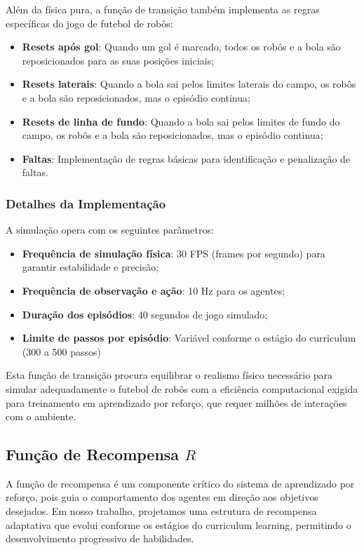 Além da física pura, a função de transição também implementa as regras específicas do jogo de futebol de robôs:

\begin{itemize}
    \item \textbf{Resets após gol}: Quando um gol é marcado, todos os robôs e a bola são reposicionados para as suas posições iniciais;
    \item \textbf{Resets laterais}: Quando a bola sai pelos limites laterais do campo, os robôs e a bola são reposicionados, mas o episódio continua;
    \item \textbf{Resets de linha de fundo}: Quando a bola sai pelos limites de fundo do campo, os robôs e a bola são reposicionados, mas o episódio continua;
    \item \textbf{Faltas}: Implementação de regras básicas para identificação e penalização de faltas.
\end{itemize}

\subsubsection{Detalhes da Implementação}

A simulação opera com os seguintes parâmetros:

\begin{itemize}
    \item \textbf{Frequência de simulação física}: 30 FPS (frames por segundo) para garantir estabilidade e precisão;
    \item \textbf{Frequência de observação e ação}: 10 Hz para os agentes;
    \item \textbf{Duração dos episódios}: 40 segundos de jogo simulado;
    \item \textbf{Limite de passos por episódio}: Variável conforme o estágio do curriculum (300 a 500 passos)
\end{itemize}

Esta função de transição procura equilibrar o realismo físico necessário para simular adequadamente o futebol de robôs com a eficiência computacional exigida para treinamento em aprendizado por reforço, que requer milhões de interações com o ambiente.

\subsection{Função de Recompensa $R$}

A função de recompensa é um componente crítico do sistema de aprendizado por reforço, pois guia o comportamento dos agentes em direção aos objetivos desejados. Em nosso trabalho, projetamos uma estrutura de recompensa adaptativa que evolui conforme os estágios do curriculum learning, permitindo o desenvolvimento progressivo de habilidades.

